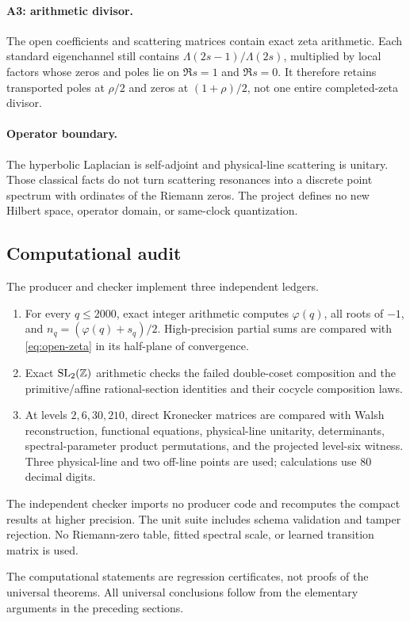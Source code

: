 \paragraph{A3: arithmetic divisor.}
The open coefficients and scattering matrices contain exact zeta arithmetic.
Each standard eigenchannel still contains
\(\Lambda(2s-1)/\Lambda(2s)\), multiplied by local factors whose zeros and
poles lie on \(\Re s=1\) and \(\Re s=0\).  It therefore retains transported
poles at \(\rho/2\) and zeros at \((1+\rho)/2\), not one entire completed-zeta
divisor.

\paragraph{Operator boundary.}
The hyperbolic Laplacian is self-adjoint and physical-line scattering is
unitary.  Those classical facts do not turn scattering resonances into a
discrete point spectrum with ordinates of the Riemann zeros.  The project
defines no new Hilbert space, operator domain, or same-clock quantization.

\subsection{Computational audit}

The producer and checker implement three independent ledgers.

\begin{enumerate}
\item For every \(q\le2000\), exact integer arithmetic computes
\(\varphi(q)\), all roots of \(-1\), and
\(n_q=(\varphi(q)+s_q)/2\).  High-precision partial sums are compared with
\cref{eq:open-zeta} in its half-plane of convergence.
\item Exact \(\operatorname{SL}_2(\mathbb{Z})\) arithmetic checks the failed double-coset composition and
the primitive/affine rational-section identities and their cocycle
composition laws.
\item At levels \(2,6,30,210\), direct Kronecker matrices are compared with
Walsh reconstruction, functional equations, physical-line unitarity,
determinants, spectral-parameter product permutations, and the projected
level-six witness.  Three physical-line and two off-line points are used;
calculations use 80 decimal digits.
\end{enumerate}

The independent checker imports no producer code and recomputes the compact
results at higher precision.  The unit suite includes schema validation and
tamper rejection.  No Riemann-zero table, fitted spectral scale, or learned
transition matrix is used.

The computational statements are regression certificates, not proofs of the
universal theorems.  All universal conclusions follow from the elementary
arguments in the preceding sections.

